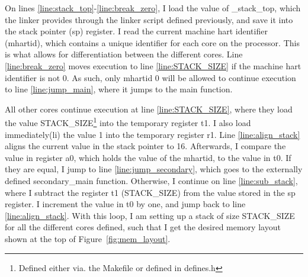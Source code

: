 On lines \ref{line:stack_top}-\ref{line:break_zero}, I load the value of
\_stack\_top, which the linker provides through the linker script defined
previously, and save it into the stack pointer (sp) register. I read the
current machine hart identifier (mhartid), which contains a unique identifier
for each core on the processor. This is what allows for differentiation between
the different cores. Line \ref{line:break_zero} moves execution to line
\ref{line:STACK_SIZE} if the machine hart identifier is not 0. As such, only
mhartid 0 will be allowed to continue execution to line \ref{line:jump_main},
where it jumps to the main function.

All other cores continue execution at line \ref{line:STACK_SIZE}, where they
load the value STACK\_SIZE\footnote{Defined either via. the Makefile or defined
in defines.h} into the temporary register t1. I also load immediately(li) the
value 1 into the temporary register r1. Line \ref{line:align_stack} aligns the
current value in the stack pointer to 16. Afterwards, I compare the value in
register a0, which holds the value of the mhartid, to the value in t0. If they
are equal, I jump to line \ref{line:jump_secondary}, which goes to the
externally defined secondary\_main function. Otherwise, I continue on line
\ref{line:sub_stack}, where I subtract the register t1 (STACK\_SIZE) from the
value stored in the sp register. I increment the value in t0 by one, and jump
back to line \ref{line:align_stack}. With this loop, I am setting up a stack of
size STACK\_SIZE for all the different cores defined, such that I get the
desired memory layout shown at the top of Figure~\ref{fig:mem_layout}.

